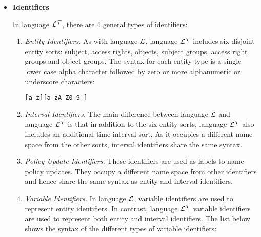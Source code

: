 \documentclass[11pt]{report}
\newenvironment{vverbatim}
{
  \begin{alltt}
}
{
    \vspace{-\baselineskip}
  \end{alltt}
}
\begin{document}
          \begin{itemize}

            \item
              {\bf Identifiers}

                In language ${\cal L^T}$, there are 4 general types of
                identifiers:

                \begin{enumerate}
                  \item
                    {\em Entity Identifiers.}
                    As with language ${\cal L}$, language ${\cal L^T}$
                    includes six disjoint entity sorts: subject, access
                    rights, objects, subject groups, access right groups and
                    object groups. The syntax for each entity type is a single
                    lower case alpha character followed by zero or more
                    alphanumeric or underscore characters:

                    \begin{vverbatim}
  [a-z][a-zA-Z0-9\_]
                    \end{vverbatim}

                  \item
                    {\em Interval Identifiers.}
                    The main difference between language ${\cal L}$ and
                    language ${\cal L^T}$ is that in addition to the six
                    entity sorts, language ${\cal L^T}$ also includes an
                    additional time interval sort. As it occupies a different
                    name space from the other sorts, interval identifiers share
                    the same syntax.

                  \item
                    {\em Policy Update Identifiers.}
                    These identifiers are used as labels to name policy
                    updates. They occupy a different name space from other
                    identifiers and hence share the same syntax as entity and
                    interval identifiers.

                  \item
                    {\em Variable Identifiers.}
                    In language ${\cal L}$, variable identifiers are used to
                    represent entity identifiers. In contrast, language
                    ${\cal L^T}$ variable identifiers are used to represent
                    both entity and interval identifiers. The list below shows
                    the syntax of the different types of variable identifiers:


\end{enumerate}
\end{itemize}
\end{document}
